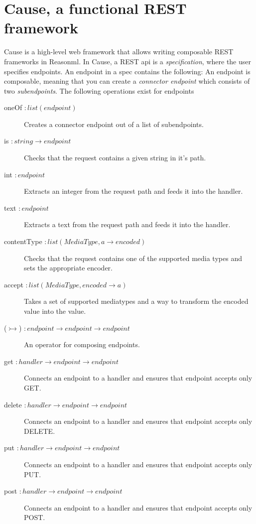 \section{Cause, a functional REST framework}

Cause is a high-level web framework that allows writing composable REST
frameworks in Reasonml. In Cause, a REST api is a \textit{specification}, where
the user specifies endpoints. An endpoint in a spec contains the following:
An endpoint is composable, meaning that you can create a \textit{connector
endpoint} which consists of two \textit{subendpoints}. The following operations
exist for endpoints

\begin{description}
\item [oneOf $: list(endpoint)$] Creates a connector endpoint out of a list of
subendpoints.
\item [is $: string \rightarrow endpoint$] Checks that the request contains a
given string in it's path.
\item [int $: endpoint$] Extracts an integer from the request path and feeds it
into the handler.
\item [text $: endpoint$] Extracts a text from the request path and feeds it into
the handler.
\item [contentType $: list(MediaType,a \rightarrow encoded)$] Checks that the
request contains one of the supported media types and sets the appropriate
encoder.
\item [accept $: list(MediaType,encoded \rightarrow a)$] Takes a set of
supported mediatypes and a way to transform the encoded value into the value.
\item [($\rightarrowtail$) $: endpoint \rightarrow endpoint \rightarrow endpoint$] 
An operator for composing endpoints.
\item [get $: handler \rightarrow endpoint \rightarrow endpoint$] Connects an
endpoint to a handler and ensures that endpoint accepts only GET.
\item [delete $: handler \rightarrow endpoint \rightarrow endpoint$] Connects an
endpoint to a handler and ensures that endpoint accepts only DELETE.
\item [put $: handler \rightarrow endpoint \rightarrow endpoint$] Connects an
endpoint to a handler and ensures that endpoint accepts only PUT.
\item [post $: handler \rightarrow endpoint \rightarrow endpoint$] Connects an
endpoint to a handler and ensures that endpoint accepts only POST.
\end{description}

